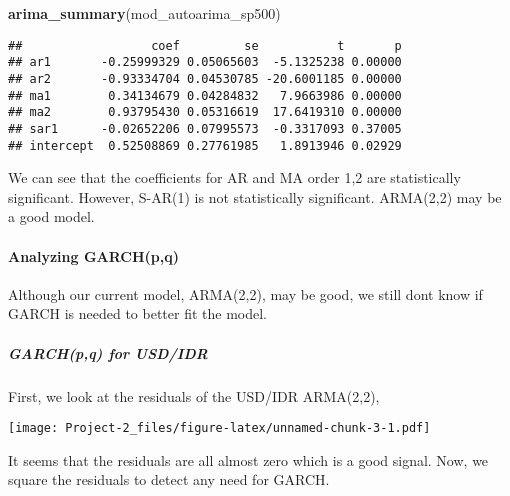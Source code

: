 \documentclass[]{article}
\newenvironment{Shaded}{\begin{snugshade}}{\end{snugshade}}
\newcommand{\KeywordTok}[1]{\textcolor[rgb]{0.13,0.29,0.53}{\textbf{#1}}}
\newcommand{\CommentTok}[1]{\textcolor[rgb]{0.56,0.35,0.01}{\textit{#1}}}
\newcommand{\OperatorTok}[1]{\textcolor[rgb]{0.81,0.36,0.00}{\textbf{#1}}}
\newcommand{\NormalTok}[1]{#1}
\let\oldparagraph\paragraph
\renewcommand{\paragraph}[1]{\oldparagraph{#1}\mbox{}}
\let\oldsubparagraph\subparagraph
\renewcommand{\subparagraph}[1]{\oldsubparagraph{#1}\mbox{}}
\begin{document}
\begin{Shaded}
\begin{Highlighting}[]
\KeywordTok{arima_summary}\NormalTok{(mod_autoarima_sp500)}
\end{Highlighting}
\end{Shaded}

\begin{verbatim}
##                  coef         se           t       p
## ar1       -0.25999329 0.05065603  -5.1325238 0.00000
## ar2       -0.93334704 0.04530785 -20.6001185 0.00000
## ma1        0.34134679 0.04284832   7.9663986 0.00000
## ma2        0.93795430 0.05316619  17.6419310 0.00000
## sar1      -0.02652206 0.07995573  -0.3317093 0.37005
## intercept  0.52508869 0.27761985   1.8913946 0.02929
\end{verbatim}

We can see that the coefficients for AR and MA order 1,2 are
statistically significant. However, S-AR(1) is not statistically
significant. ARMA(2,2) may be a good model.

\paragraph{Analyzing GARCH(p,q)}\label{analyzing-garchpq}

Although our current model, ARMA(2,2), may be good, we still dont know
if GARCH is needed to better fit the model.

\subparagraph{GARCH(p,q) for USD/IDR}\label{garchpq-for-usdidr}

First, we look at the residuals of the USD/IDR ARMA(2,2),

\begin{Shaded}
\end{Shaded}

\texttt{[image: Project-2\_files/figure-latex/unnamed-chunk-3-1.pdf]}

It seems that the residuals are all almost zero which is a good signal.
Now, we square the residuals to detect any need for GARCH.

\begin{Shaded}
\end{Shaded}
\end{document}
